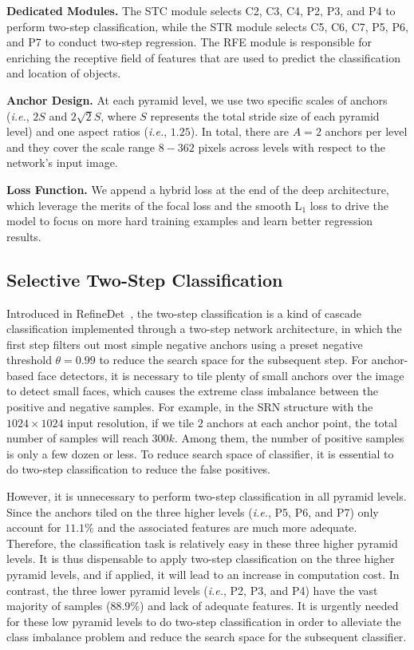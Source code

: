\documentclass[letterpaper]{article} \usepackage{aaai19m}  \usepackage{times}  \usepackage{helvet}  \usepackage{courier}  \usepackage{url}  \usepackage{graphicx}  \usepackage{subfigure}
\def\ie{{\em i.e.}}
\begin{document}
{\flushleft \textbf{Dedicated Modules.} }
The STC module selects C2, C3, C4, P2, P3, and P4 to perform two-step classification, while the STR module selects C5, C6, C7, P5, P6, and P7 to conduct two-step regression. The RFE module is responsible for enriching the receptive field of features that are used to predict the classification and location of objects.

{\flushleft \textbf{Anchor Design.} }
At each pyramid level, we use two specific scales of anchors (\ie, $2S$ and $2\sqrt{2}S$, where $S$ represents the total stride size of each pyramid level) and one aspect ratios (\ie, $1.25$). In total, there are $A=2$ anchors per level and they cover the scale range $8-362$ pixels across levels with respect to the network's input image.

{\flushleft \textbf{Loss Function.} }
We append a hybrid loss at the end of the deep architecture, which leverage the merits of the focal loss and the smooth L$_1$ loss to drive the model to focus on more hard training examples and learn better regression results. 

\subsection{Selective Two-Step Classification}
Introduced in RefineDet~\cite{DBLP:journals/corr/abs-1711-06897}, the two-step classification is a kind of cascade classification implemented through a two-step network architecture, in which the first step filters out most simple negative anchors using a preset negative threshold $\theta=0.99$ to reduce the search space for the subsequent step. For anchor-based face detectors, it is necessary to tile plenty of small anchors over the image to detect small faces, which causes the extreme class imbalance between the positive and negative samples. For example, in the SRN structure with the $1024\times1024$ input resolution, if we tile $2$ anchors at each anchor point, the total number of samples will reach $300k$. Among them, the number of positive samples is only a few dozen or less. To reduce search space of classifier, it is essential to do two-step classification to reduce the false positives.

However, it is unnecessary to perform two-step classification in all pyramid levels. Since the anchors tiled on the three higher levels (\ie, P5, P6, and P7) only account for $11.1\%$ and the associated features are much more adequate. Therefore, the classification task is relatively easy in these three higher pyramid levels. It is thus dispensable to apply two-step classification on the three higher pyramid levels, and if applied, it will lead to an increase in computation cost. In contrast, the three lower pyramid levels (\ie, P2, P3, and P4) have the vast majority of samples ($88.9\%$) and lack of adequate features. It is urgently needed for these low pyramid levels to do two-step classification in order to alleviate the class imbalance problem and reduce the search space for the subsequent classifier.
\end{document}
